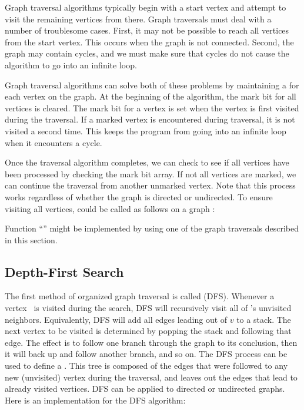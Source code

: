 Graph traversal algorithms typically begin with a start vertex and
attempt to visit the remaining vertices from there.
Graph traversals must deal with a number of troublesome cases.
First, it may not be possible to reach all vertices from the start
vertex.
This occurs when the graph is not connected.
Second, the graph may contain cycles, and we must make sure that
cycles do not cause the algorithm to go into an infinite loop.


Graph traversal algorithms can solve both of these problems
by maintaining a  for each vertex on the graph.
At the beginning of the algorithm, the mark bit for all vertices is
cleared.
The mark bit for a vertex is set when the vertex is first visited
during the traversal.
If a marked vertex is encountered during traversal, it is not visited
a second time.
This keeps the program from going into an infinite loop when it
encounters a cycle.

Once the traversal algorithm completes, we can check to see if all
vertices have been processed by checking the mark bit array.
If not all vertices are marked,
we can continue the traversal from another unmarked vertex.
Note that this process works regardless of whether the graph is
directed or undirected.
To ensure visiting all vertices,  could be called
as follows on a graph :


\noindent Function ``'' might be implemented by using
one of the graph traversals described in this section.

\subsection{Depth-First Search}

The first method of organized graph traversal is called
 (DFS).
Whenever a vertex~ is visited during the search,
DFS will recursively visit all of 's unvisited neighbors.
Equivalently, DFS will add all edges leading out of \(v\) to a
stack.
The next vertex to be visited is determined by popping the stack and
following that edge.
The effect is to follow one branch through the graph to its
conclusion, then it will back up and follow another branch, and so on.
The DFS process can be used to define a
.
This tree is composed of the edges that were followed to any new
(unvisited) vertex during the traversal, and leaves out the edges that
lead to already visited vertices.
DFS can be applied to directed or undirected graphs.
Here is an implementation for the DFS algorithm:

